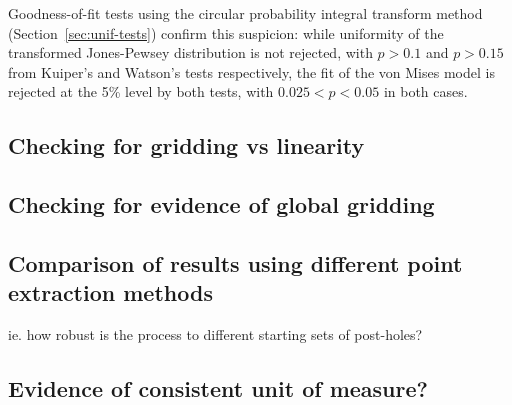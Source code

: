 \documentclass[../../ArchStats.tex]{subfiles}
\begin{document}
Goodness-of-fit tests using the circular probability integral transform method (Section~\ref{sec:unif-tests}) confirm this suspicion: while uniformity of the transformed Jones-Pewsey distribution is not rejected, with $p>0.1$ and $p>0.15$ from Kuiper's and Watson's tests respectively, the fit of the von Mises model is rejected at the 5\% level by both tests, with $0.025<p<0.05$ in both cases.


\subsection{Checking for gridding vs linearity}

\subsection{Checking for evidence of global gridding}


\subsection{Comparison of results using different point extraction methods}
ie. how robust is the process to different starting sets of post-holes?

\subsection{Evidence of consistent unit of measure?}
\end{document}

